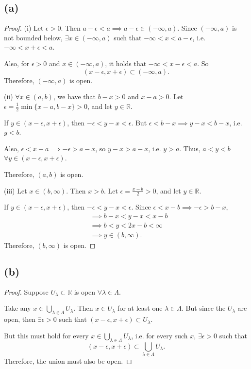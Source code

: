 \documentclass{article}
\begin{document}
\subsection*{(a)}
\begin{proof}
	(i) Let $\epsilon>0$. Then $a-\epsilon < a \implies a-\epsilon \in (-\infty, a)$.
	Since $(-\infty, a)$ is not bounded below, $\exists x \in (-\infty, a)$ such that $-\infty < x < a-\epsilon$, i.e. $-\infty < x+\epsilon<a$. 
	
	Also, for $\epsilon>0$ and $x\in(-\infty,a)$, it holds that $-\infty<x-\epsilon<a$. So
	\begin{equation}
		(x-\epsilon, x+\epsilon) \subset (-\infty,a).
	\end{equation}
	Therefore, $(-\infty, a)$ is open.
	
	(ii) $\forall x \in (a,b)$, we have that $b-x>0$ and $x-a>0$. Let $\epsilon = \frac{1}{2}\min\{x-a, b-x\}>0$, and let $y\in\mathbb{R}$.
	
	If $y\in(x-\epsilon, x+\epsilon)$, then $-\epsilon<y-x<\epsilon$. But $\epsilon < b-x \implies y-x < b-x$, i.e. $y<b$.
	
	Also, $\epsilon < x-a\implies -\epsilon>a-x$, so $y-x>a-x$, i.e. $y>a$. Thus, $a<y<b$ $\forall y\in(x-\epsilon, x+\epsilon)$.
	
	Therefore, $(a,b)$ is open.
	
	(iii) Let $x\in (b, \infty)$. Then $x>b$. Let $\epsilon = \frac{x-b}{2}>0$, and let $y\in\mathbb{R}$. 
	
	If $y\in(x-\epsilon, x+\epsilon)$, then $-\epsilon<y-x<\epsilon$. Since $\epsilon<x-b \implies -\epsilon>b-x$, 
	\begin{align}
		&\implies b-x<y-x<x-b \\
		&\implies b<y<2x-b< \infty \\
		&\implies y \in (b, \infty).
	\end{align}
	Therefore, $(b, \infty)$ is open. 
\end{proof}

\subsection*{(b)}
\begin{proof}
	Suppose $U_{\lambda}\subset \mathbb{R}$ is open $\forall \lambda \in \Lambda$. 
	
	Take any $x\in\bigcup_{\lambda\in\Lambda}U_{\lambda}$. Then $x\in U_{\lambda}$ for at least one $\lambda\in\Lambda$. But since the $U_{\lambda}$ are open, then $\exists \epsilon >0$ such that $(x-\epsilon, x+\epsilon)\subset U_{\lambda}$. 
	
	But this must hold for every $x\in\bigcup_{\lambda\in\Lambda}U_{\lambda}$, i.e. for every such $x$, $\exists \epsilon>0$ such that
	\begin{equation}
		(x-\epsilon, x+\epsilon)\subset \bigcup_{\lambda\in\Lambda}U_{\lambda}.
	\end{equation} 
	Therefore, the union must also be open.
\end{proof}
\end{document}
